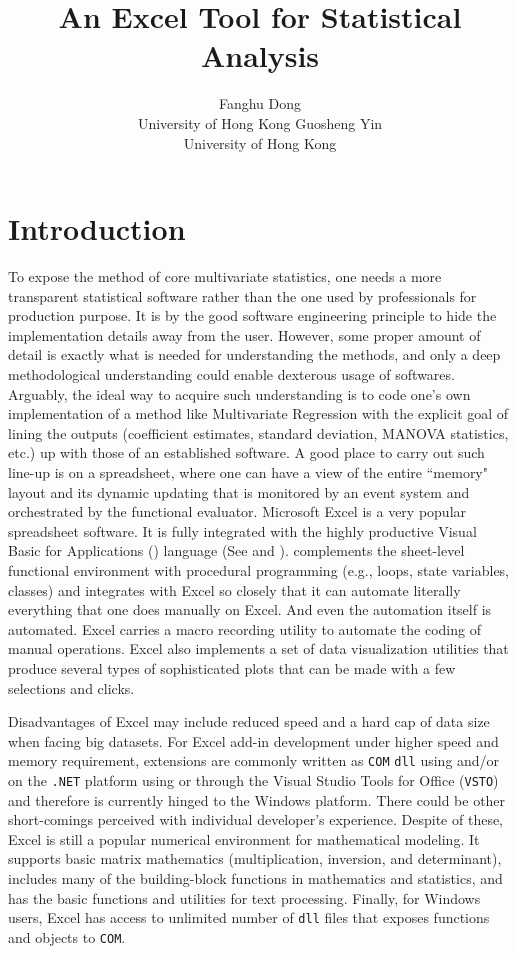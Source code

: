\documentclass[article]{jss}
\author{Fanghu Dong\\University of Hong Kong \And Guosheng Yin\\University of Hong Kong}
\title{An Excel Tool for Statistical Analysis}
\numberwithin{equation}{subsection}
\begin{document}
  
  
  
  
  
    \section[intro]{Introduction}
        To expose the method of core multivariate statistics, one needs a more transparent statistical software rather than the one used by professionals for production purpose. It is by the good software engineering principle to hide the implementation details away from the user. However, some proper amount of detail is exactly what is needed for understanding the methods, and only a deep methodological understanding could enable dexterous usage of softwares. Arguably, the ideal way to acquire such understanding is to code one's own implementation of a method like Multivariate Regression with the explicit goal of lining the outputs (coefficient estimates, standard deviation, MANOVA statistics, etc.) up with those of an established software. A good place to carry out such line-up is on a spreadsheet, where one can have a view of the entire ``memory" layout and its dynamic updating that is monitored by an event system and orchestrated by the functional evaluator. Microsoft Excel is a very popular spreadsheet software. It is fully integrated with the highly productive Visual Basic for Applications () language (See \cite{GreenBullenBoveyAlexanderExcel2007VBAProgrammerReference} and \cite{msdnExcelVBAReference}).  complements the sheet-level functional environment with procedural programming (e.g., loops, state variables, classes) and integrates with Excel so closely that it can automate literally everything that one does manually on Excel. And even the automation itself is automated. Excel carries a macro recording utility to automate the coding of manual operations. Excel also implements a set of data visualization utilities that produce several types of sophisticated plots that can be made with a few selections and clicks.
  
  
        Disadvantages of Excel may include reduced speed and a hard cap of data size when facing big datasets. For Excel add-in development under higher speed and memory requirement, extensions are commonly written as \texttt{COM} \texttt{dll} using   and/or on the \texttt{.NET} platform using  or  through the Visual Studio Tools for Office (\texttt{VSTO}) and therefore is currently hinged to the Windows platform. There could be other short-comings perceived with individual developer's experience. Despite of these, Excel is still a popular numerical environment for mathematical modeling. It supports basic matrix mathematics (multiplication, inversion, and determinant), includes many of the building-block functions in mathematics and statistics, and has the basic functions and utilities for text processing. Finally, for Windows users, Excel has access to unlimited number of \texttt{dll} files that exposes functions and objects to \texttt{COM}.
  
\end{document}
